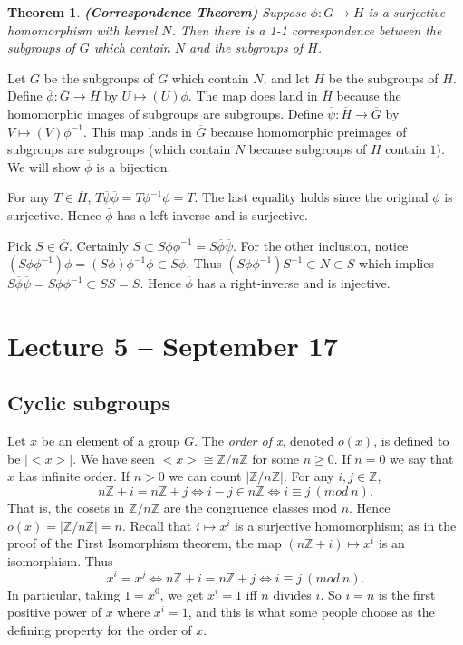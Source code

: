 \documentclass[letterpaper]{article}
\newtheorem{theorem}{Theorem}[section]
\newenvironment{proof}[1][Proof]{\begin{trivlist}
\item[\hskip \labelsep {\bfseries #1}]}{\end{trivlist}}
\begin{document}
\begin{theorem}
\emph{\textbf{(Correspondence Theorem)}}
Suppose $\phi \colon G \rightarrow H$ is a surjective homomorphism with kernel $N$. Then there is a 1-1 correspondence between the subgroups of $G$ which contain $N$ and the subgroups of $H$.
\end{theorem}
\begin{proof}
Let $\overline G$ be the subgroups of $G$ which contain $N$, and let $\overline H$ be the subgroups of $H$. Define $\overline \phi \colon \overline G \rightarrow \overline H$ by $U \mapsto (U)\phi$. The map does land in $\overline H$ because the homomorphic images of subgroups are subgroups. Define $\overline \psi \colon \overline H \rightarrow \overline G$ by $V \mapsto (V)\phi^{-1}$. This map lands in $\overline G$ because homomorphic preimages of subgroups are subgroups (which contain $N$ because subgroups of $H$ contain $1$). We will show $\overline \phi$ is a bijection.

For any $T \in \overline H$, $T\overline\psi \overline\phi = T\phi^{-1}\phi = T$. The last equality holds since the original $\phi$ is surjective. Hence $\overline\phi$ has a left-inverse and is surjective.

Pick $S \in \overline G$.  Certainly $S \subset S\phi\phi^{-1} = S\overline\phi \overline\psi$. For the other inclusion, notice $(S\phi\phi^{-1})\phi = (S\phi)\phi^{-1}\phi \subset S\phi$. Thus $(S\phi\phi^{-1})S^{-1} \subset N \subset S$ which implies $S\overline\phi \overline\psi = S\phi\phi^{-1} \subset SS = S$. Hence $\overline\phi$ has a right-inverse and is injective.
\end{proof}

\section{Lecture 5 -- September 17}

\subsection{Cyclic subgroups}

Let $x$ be an element of a group $G$. The \emph{order of x}, denoted $o(x)$, is defined to be $|{<}x{>}|$. We have seen ${<}x{>} \cong \mathbb{Z}/n\mathbb{Z}$ for some $n \ge 0$. If $n = 0$ we say that $x$ has infinite order. If $n > 0$ we can count $|\mathbb{Z}/n\mathbb{Z}|$. For any $i, j \in \mathbb{Z}$,
\[
n\mathbb{Z} + i = n\mathbb{Z} + j \Longleftrightarrow i - j \in n\mathbb{Z} 
\Longleftrightarrow i \equiv j\ (mod\ n).
\]
That is, the cosets in $\mathbb{Z}/n\mathbb{Z}$ are the congruence classes mod $n$. Hence $o(x) = |\mathbb{Z}/n\mathbb{Z}| = n$. Recall that $i \mapsto x^i$ is a surjective homomorphism; as in the proof of the First Isomorphism theorem, the map $(n\mathbb{Z} + i) \mapsto x^i$ is an isomorphism. Thus
\[
x^i = x^j \Longleftrightarrow n\mathbb{Z} + i = n\mathbb{Z} + j \Longleftrightarrow i \equiv j\ (mod\ n).
\]
In particular, taking $1 = x^0$, we get $x^i = 1$ iff $n$ divides $i$. So $i = n$ is the first positive power of $x$ where $x^i = 1$, and this is what some people choose as the defining property for the order of $x$.
\end{document}
